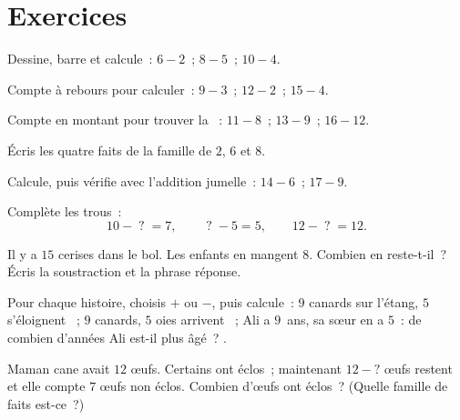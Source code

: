 \section{Exercices}

\begin{exercise}[$\star$]\label{exo:g1:subtraction:1}
Dessine, barre et calcule~: $6 - 2$~; \quad $8 - 5$~; \quad
$10 - 4$.
\end{exercise}

\begin{exercise}[$\star$]\label{exo:g1:subtraction:2}
Compte à rebours pour calculer~: $9 - 3$~; \quad $12 - 2$~; \quad
$15 - 4$.
\end{exercise}

\begin{exercise}[$\star$]\label{exo:g1:subtraction:3}
Compte en montant pour trouver la ~: $11 - 8$~; \quad
$13 - 9$~; \quad $16 - 12$.
\end{exercise}

\begin{exercise}[$\star$]\label{exo:g1:subtraction:4}
Écris les quatre faits de la famille de $2$, $6$ et $8$.
\end{exercise}

\begin{exercise}[$\star$]\label{exo:g1:subtraction:5}
Calcule, puis vérifie avec l'addition jumelle~: $14 - 6$~; \quad
$17 - 9$.
\end{exercise}

\begin{exercise}[$\star$]\label{exo:g1:subtraction:6}
Complète les trous~:
\[
10 - \;?\; = 7, \qquad
\;?\; - 5 = 5, \qquad
12 - \;?\; = 12 .
\]
\end{exercise}

\begin{exercise}[$\star$]\label{exo:g1:subtraction:7}
\guillemotleft{} Il y a $15$ cerises dans le bol. Les enfants en
mangent $8$. Combien en reste-t-il~? \guillemotright{} Écris la
soustraction et la phrase réponse.
\end{exercise}

\begin{exercise}[$\star$]\label{exo:g1:subtraction:8}
Pour chaque histoire, choisis $+$ ou $-$, puis calcule~:
\guillemotleft{} $9$ canards sur l'étang, $5$ s'éloignent
\guillemotright{}~; \guillemotleft{} $9$ canards, $5$ oies
arrivent \guillemotright{}~; \guillemotleft{} Ali a $9$~ans, sa
sœur en a $5$~: de combien d'années Ali est-il plus âgé~?
\guillemotright{}.
\end{exercise}

\begin{exercise}[$\star\star$]\label{exo:g1:subtraction:9}
Maman cane avait $12$ œufs. Certains ont éclos~; maintenant
$12 - ?$ œufs restent et elle compte $7$ œufs non éclos.
Combien d'œufs ont éclos~? (Quelle famille de faits est-ce~?)
\end{exercise}

